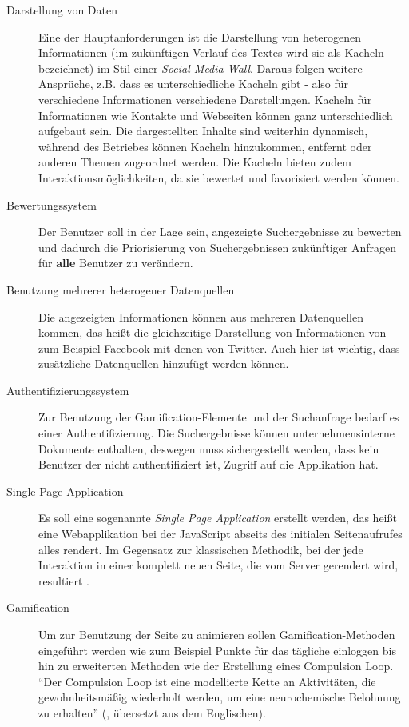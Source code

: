 \documentclass[12pt,twoside]{book}
\begin{document}
\begin{description}

\item[Darstellung von Daten]

Eine der Hauptanforderungen ist die Darstellung von heterogenen Informationen (im zukünftigen Verlauf des Textes wird sie als Kacheln bezeichnet) im Stil einer \textit{Social Media Wall}. Daraus folgen weitere Ansprüche, z.B. dass es unterschiedliche Kacheln gibt - also für verschiedene Informationen verschiedene Darstellungen. Kacheln für Informationen wie Kontakte und Webseiten können ganz unterschiedlich aufgebaut sein. Die dargestellten Inhalte sind weiterhin dynamisch, während des Betriebes können Kacheln hinzukommen, entfernt oder anderen Themen zugeordnet werden. Die Kacheln bieten zudem Interaktionsmöglichkeiten, da sie bewertet und favorisiert werden können.

\item[Bewertungssystem]

  Der Benutzer soll in der Lage sein, angezeigte Suchergebnisse zu bewerten und dadurch die Priorisierung von Suchergebnissen zukünftiger Anfragen für \textbf{alle} Benutzer zu verändern.

\item[Benutzung mehrerer heterogener Datenquellen]
  Die angezeigten Informationen können aus mehreren Datenquellen kommen, das heißt die gleichzeitige Darstellung von Informationen von zum Beispiel Facebook mit denen von Twitter. Auch hier ist wichtig, dass zusätzliche Datenquellen hinzufügt werden können.

\item[Authentifizierungssystem]
	Zur Benutzung der Gamification-Elemente und der Suchanfrage bedarf es einer Authentifizierung. Die Suchergebnisse können unternehmensinterne Dokumente enthalten, deswegen muss sichergestellt werden, dass kein Benutzer der nicht authentifiziert ist, Zugriff auf die Applikation hat.

\item[Single Page Application]
  Es soll eine sogenannte \textit{Single Page Application} erstellt werden, das heißt eine Webapplikation bei der JavaScript abseits des initialen Seitenaufrufes alles rendert. Im Gegensatz zur klassischen Methodik, bei der jede Interaktion in einer komplett neuen Seite, die vom Server gerendert wird, resultiert \cite{mesbah2007migrating}.

\item[Gamification]
  Um zur Benutzung der Seite zu animieren sollen Gamification-Methoden eingeführt werden wie zum Beispiel Punkte für das tägliche einloggen bis hin zu erweiterten Methoden wie der Erstellung eines Compulsion Loop. ``Der Compulsion Loop ist eine modellierte Kette an Aktivitäten, die gewohnheitsmäßig wiederholt werden, um eine neurochemische Belohnung zu erhalten'' (\cite{gamasutra}, übersetzt aus dem Englischen).


\end{description}
\end{document}
